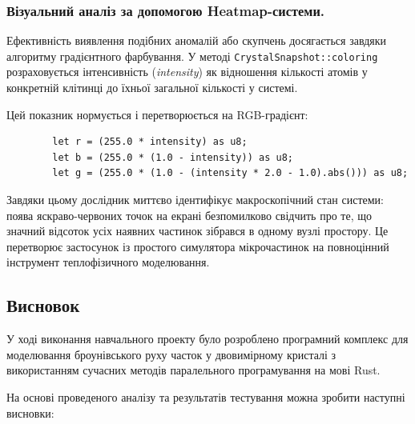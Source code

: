 \documentclass[14pt, a4paper]{extreport}
\begin{document}
	\subsubsection{Візуальний аналіз за допомогою Heatmap-системи.}
	
	Ефективність виявлення подібних аномалій або скупчень досягається завдяки алгоритму градієнтного фарбування. У методі \texttt{CrystalSnapshot::coloring} розраховується інтенсивність (\textit{intensity}) як відношення кількості атомів у конкретній клітинці до їхньої загальної кількості у системі.
	
	Цей показник нормується і перетворюється на RGB-градієнт:
	\begin{verbatim}
		let r = (255.0 * intensity) as u8;
		let b = (255.0 * (1.0 - intensity)) as u8;
		let g = (255.0 * (1.0 - (intensity * 2.0 - 1.0).abs())) as u8;
	\end{verbatim}
	
	Завдяки цьому дослідник миттєво ідентифікує макроскопічний стан системи: поява яскраво-червоних точок на екрані безпомилково свідчить про те, що значний відсоток усіх наявних частинок зібрався в одному вузлі простору. Це перетворює застосунок із простого симулятора мікрочастинок на повноцінний інструмент теплофізичного моделювання.
	
	\subsection*{Висновок}
	
	У ході виконання навчального проекту було розроблено програмний комплекс для моделювання броунівського руху часток у двовимірному кристалі з використанням сучасних методів паралельного програмування на мові Rust. 
	
	На основі проведеного аналізу та результатів тестування можна зробити наступні висновки:
	
\end{document}
